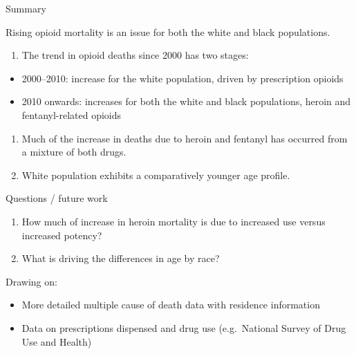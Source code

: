 \documentclass[ignorenonframetext,]{beamer}
\providecommand{\tightlist}{%
\setlength{\itemsep}{0pt}\setlength{\parskip}{0pt}}
\begin{document}
\begin{frame}{Summary}

Rising opioid mortality is an issue for both the white and black
populations.

\begin{enumerate}
\def\labelenumi{\arabic{enumi}.}
\tightlist
\item
  The trend in opioid deaths since 2000 has two stages:
\end{enumerate}

\begin{itemize}
\tightlist
\item
  2000--2010: increase for the white population, driven by prescription
  opioids
\item
  2010 onwards: increases for both the white and black populations,
  heroin and fentanyl-related opioids
\end{itemize}

\begin{enumerate}
\def\labelenumi{\arabic{enumi}.}
\setcounter{enumi}{1}
\tightlist
\item
  Much of the increase in deaths due to heroin and fentanyl has occurred
  from a mixture of both drugs.
\item
  White population exhibits a comparatively younger age profile.
\end{enumerate}

\end{frame}

\begin{frame}{Questions / future work}

\begin{enumerate}
\def\labelenumi{\arabic{enumi}.}
\tightlist
\item
  How much of increase in heroin mortality is due to increased use
  versus increased potency?
\item
  What is driving the differences in age by race?
\end{enumerate}

Drawing on:

\begin{itemize}
\tightlist
\item
  More detailed multiple cause of death data with residence information
\item
  Data on prescriptions dispensed and drug use (e.g.~National Survey of
  Drug Use and Health)
\end{itemize}

\end{frame}
\end{document}
